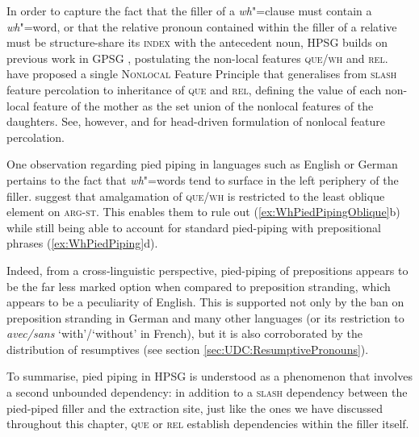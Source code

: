 \documentclass[output=paper
                ,modfonts
                ,nonflat
	        ,collection
	        ,collectionchapter
	        ,collectiontoclongg
 	        ,biblatex
                ,babelshorthands
                ,newtxmath
                ,draftmode
                ,colorlinks, citecolor=brown
]{./langsci/langscibook}
\begin{document}
{\noindent
In order to capture  the fact that the filler of a \emph{wh}"=clause must
contain a \emph{wh}"=word, or that the relative pronoun contained within the
filler of a relative must be structure-share its \textsc{index} with the antecedent noun, HPSG builds on previous work in GPSG \citep{Gazdar85}, postulating the non-local features \textsc{que/wh} and \textsc{rel}. \citet{Pollard:Sag:94} have proposed a single \textsc{Nonlocal} Feature Principle that generalises from \textsc{slash} feature percolation to inheritance of \textsc{que} and \textsc{rel}, defining the value of each non-local feature of the mother as the set union of the nonlocal features of the daughters. See, however, \citet{Sag:97} and \citet{Ginzburg:Sag:01} for head-driven formulation of nonlocal feature percolation. 

One observation regarding pied piping in languages such as English or German pertains to the fact that \emph{wh}"=words tend to surface in the left periphery of the filler. \citet{Ginzburg:Sag:01} suggest that amalgamation of \textsc{que/wh} is restricted to the least oblique element on \textsc{arg-st}. This enables them to rule out  (\ref{ex:WhPiedPipingOblique}b) while still being able to account for standard pied-piping with prepositional phrases (\ref{ex:WhPiedPiping}d). 

\begin{exe}
  \ex \label{ex:WhPiedPipingOblique}
  \begin{xlist}
  \end{xlist}
\end{exe}

\noindent
Indeed, from a cross-linguistic perspective, pied-piping of prepositions appears to be the far less marked option when compared to preposition stranding, which appears to be a peculiarity of English. This is supported not only by the ban on preposition stranding in German and many other languages (or its restriction to \textit{avec/sans} `with'/`without' in French),  but it is also corroborated by the distribution of resumptives (see section \ref{sec:UDC:ResumptivePronouns}). 

To summarise, pied piping in HPSG is understood as a phenomenon that involves a second unbounded dependency: in addition to a \textsc{slash} dependency between the pied-piped filler and the extraction site, just like the ones we have discussed throughout this chapter, \textsc{que} or \textsc{rel} establish dependencies within the filler itself. 

}
\end{document}
